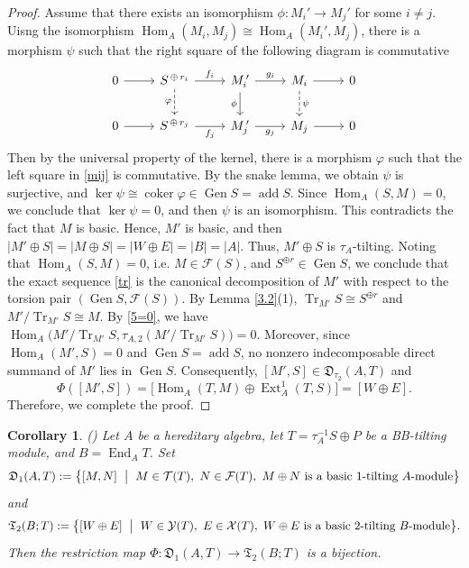 \documentclass[reqno,12pt]{amsart}
\numberwithin{equation}{section}
\theoremstyle{plain}
\newtheorem{corollary}[theorem]{\bf Corollary}
\theoremstyle{definition}
\begin{document}
\begin{proof}
Assume that there exists an isomorphism $\phi:M_i'\to M_j'$ for some $i\ne j$. Uisng the isomorphism $\operatorname{Hom}_A(M_i,M_j) \cong \operatorname{Hom}_A(M_i',M_j)$, there is a morphism $\psi$ such that the right square of the following diagram is commutative
 \begin{equation}\label{mij}
\begin{tikzcd}
	0 & {S^{\,\oplus\,r_i}} & {M_i^{\,\prime}} & {M_i} & 0 \\
	0 & {S^{\,\oplus\,r_j}} & {M_j^{\,\prime}} & {M_j} & 0
	\arrow[from=1-1, to=1-2]
	\arrow["{f_i}", from=1-2, to=1-3]
	\arrow["\varphi"', dashed, from=1-2, to=2-2]
	\arrow["{g_i}", from=1-3, to=1-4]
	\arrow["\phi"', from=1-3, to=2-3]
	\arrow[from=1-4, to=1-5]
	\arrow["\psi", dashed, from=1-4, to=2-4]
	\arrow[from=2-1, to=2-2]
	\arrow["{f_j}"', from=2-2, to=2-3]
	\arrow["{g_j}"', from=2-3, to=2-4]
	\arrow[from=2-4, to=2-5]
\end{tikzcd}
\end{equation}
Then by the universal property of the kernel, there is a morphism $\varphi$ such that the left square in \eqref{mij} is commutative. By the snake lemma, we obtain $\psi$ is surjective, and $\operatorname{ker}\psi \cong \operatorname{coker}\varphi \in \operatorname{Gen}S=\operatorname{add}S$. Since $\operatorname{Hom}_A(S,M)=0$, we conclude that $\operatorname{ker}\psi=0$, and then $\psi$ is an isomorphism. This contradicts the fact that $M$ is basic. Hence, $M'$ is basic, and then
$|M' \oplus S|=|M\oplus S|=|W \oplus E|=|B|=|A|$.
Thus, $M'\oplus S$ is $\tau_A$-tilting.
Noting that $\operatorname{Hom}_A(S,M)=0$, i.e. $M\in\mathcal F(S)$, and $S^{\oplus r}\in\operatorname{Gen}S$, we conclude that
the exact sequence \eqref{tr} is the canonical decomposition of $M'$ with
respect to the torsion pair $(\operatorname{Gen}S,\mathcal F(S))$. By Lemma \ref{3.2}(1),
\(
\operatorname{Tr}_{M'}S\cong S^{\oplus r}\) and
 \(M'/\operatorname{Tr}_{M'}S\cong M.
\)
By \eqref{5=0}, we have
$\operatorname{Hom}_A\bigl(M'/\operatorname{Tr}_{M'}S,
 \tau_{A,2}(M'/\operatorname{Tr}_{M'}S)\bigr)=0.$
Moreover, since $\operatorname{Hom}_A(M',S)=0$ and
$\operatorname{Gen}S=\operatorname{add}S$, no nonzero
indecomposable direct summand of $M'$ lies in $\operatorname{Gen}S$.
Consequently,
$[M',S]\in\mathfrak D_{\tau_2}(A,T)$ and
\[
\Phi([M',S])
=\bigl[\operatorname{Hom}_A(T,M)\oplus\operatorname{Ext}_A^1(T,S)\bigr]
=[W\oplus E].
\]
Therefore, we complete the proof.
\end{proof}
\begin{corollary}\label{phi-bijection-bb}
\textup{(\cite[Proposition 3.3]{PENG})}
Let $A$ be a hereditary algebra, let
$T=\tau_A^{-1}S\oplus P$ be a BB-tilting module, and
$B=\operatorname{End}_A T$. Set
\[
\mathfrak D_1(A,T):=
\bigl\{[M,N]\ \bigm|\ M\in\mathcal T(T),\
N\in\mathcal F(T),\
M\oplus N\text{ is a basic }1\text{-tilting }A\text{-module}\bigr\}
\]
and
\[
\mathfrak T_2(B;T):=
\bigl\{[W\oplus E]\ \bigm|\
W\in\mathcal Y(T),\ E\in\mathcal X(T),\
W\oplus E\text{ is a basic }2\text{-tilting }B\text{-module}\bigr\}.
\]
Then the restriction map
$\Phi:\mathfrak D_1(A,T)\longrightarrow\mathfrak T_2(B;T)$
is a bijection.
\end{corollary}
\end{document}

